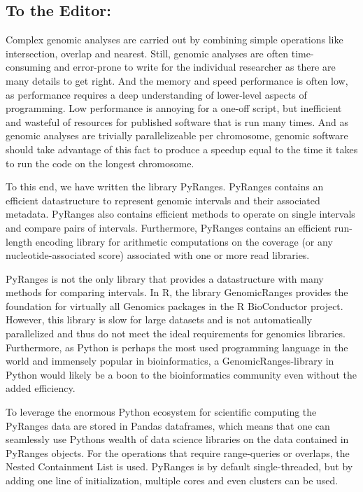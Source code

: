\documentclass[10pt,letterpaper]{article}
\begin{document}
\subsection*{To the Editor:} Complex genomic analyses are carried out by
combining simple operations like intersection, overlap and nearest. Still,
genomic analyses are often time-consuming and error-prone to write for the
individual researcher as there are many details to get right. And the memory and
speed performance is often low, as performance requires a deep understanding of
lower-level aspects of programming. Low performance is annoying for a one-off
script, but inefficient and wasteful of resources for published software that is
run many times. And as genomic analyses are trivially parallelizeable per
chromosome, genomic software should take advantage of this fact to produce a
speedup equal to the time it takes to run the code on the longest chromosome.

To this end, we have written the library PyRanges. PyRanges contains an
efficient datastructure to represent genomic intervals and their associated
metadata. PyRanges also contains efficient methods to operate on single
intervals and compare pairs of intervals. Furthermore, PyRanges contains an
efficient run-length encoding library for arithmetic computations on the
coverage (or any nucleotide-associated score) associated with one or more read
libraries.

PyRanges is not the only library that provides a datastructure with many methods
for comparing intervals. In R, the library GenomicRanges
\cite{10.1371/journal.pcbi.1003118} provides the foundation for virtually all
Genomics packages in the R BioConductor \cite{Gentleman2004} project. However,
this library is slow for large datasets and is not automatically parallelized
and thus do not meet the ideal requirements for genomics libraries. Furthermore,
as Python is perhaps the most used programming language in the world and
immensely popular in bioinformatics, a GenomicRanges-library in Python would
likely be a boon to the bioinformatics community even without the added
efficiency.

To leverage the enormous Python ecosystem for scientific computing the PyRanges
data are stored in Pandas dataframes, which means that one can seamlessly use
Pythons wealth of data science libraries on the data contained in PyRanges
objects. For the operations that require range-queries or overlaps, the Nested
Containment List \cite{doi:10.1093/bioinformatics/btl647} is used. PyRanges is
by default single-threaded, but by adding one line of initialization, multiple
cores and even clusters can be used.
\end{document}
